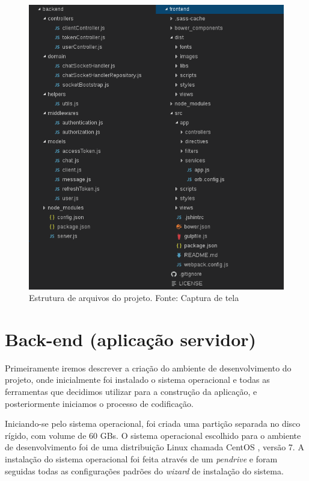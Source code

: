 \begin{figure}[H]
	\centering
	\includegraphics[scale=0.75]{imagens/estrutura_arquivos.png}
	\caption{\small Estrutura de arquivos do projeto. Fonte: Captura de tela}
	\label{fig:estrutura-arquivos}
\end{figure}

\section{Back-end (aplicação servidor)}
Primeiramente iremos descrever a criação do ambiente de desenvolvimento do projeto, onde inicialmente foi instalado o sistema operacional e todas as ferramentas que decidimos utilizar para a construção da aplicação, e posteriormente iniciamos o processo de codificação.

Iniciando-se pelo sistema operacional, foi criada uma partição separada no disco rígido, com volume de 60 GBs. O sistema operacional escolhido para o ambiente de desenvolvimento foi de uma distribuição Linux chamada CentOS \cite{centos}, versão 7. A instalação do sistema operacional foi feita através de um \textit{pendrive} e foram seguidas todas as configurações padrões do \textit{wizard} de instalação do sistema.

